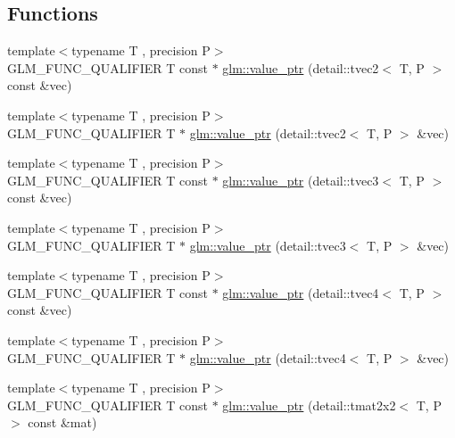 \subsection*{Functions}
\begin{DoxyCompactItemize}
\item 
{\footnotesize template$<$typename T , precision P$>$ }\\G\+L\+M\+\_\+\+F\+U\+N\+C\+\_\+\+Q\+U\+A\+L\+I\+F\+I\+ER T const $\ast$ \hyperlink{group__gtc__type__ptr_gac57a976f59e794e6406ecf2924a18f4e}{glm\+::value\+\_\+ptr} (detail\+::tvec2$<$ T, P $>$ const \&vec)
\item 
{\footnotesize template$<$typename T , precision P$>$ }\\G\+L\+M\+\_\+\+F\+U\+N\+C\+\_\+\+Q\+U\+A\+L\+I\+F\+I\+ER T $\ast$ \hyperlink{group__gtc__type__ptr_gac2a64387090621acf7176b63f31b70a2}{glm\+::value\+\_\+ptr} (detail\+::tvec2$<$ T, P $>$ \&vec)
\item 
{\footnotesize template$<$typename T , precision P$>$ }\\G\+L\+M\+\_\+\+F\+U\+N\+C\+\_\+\+Q\+U\+A\+L\+I\+F\+I\+ER T const $\ast$ \hyperlink{group__gtc__type__ptr_ga676a0ba6f4b7cd817fe6d16cb3113857}{glm\+::value\+\_\+ptr} (detail\+::tvec3$<$ T, P $>$ const \&vec)
\item 
{\footnotesize template$<$typename T , precision P$>$ }\\G\+L\+M\+\_\+\+F\+U\+N\+C\+\_\+\+Q\+U\+A\+L\+I\+F\+I\+ER T $\ast$ \hyperlink{group__gtc__type__ptr_ga4babc9956e32bbd0769bc20ab2d73800}{glm\+::value\+\_\+ptr} (detail\+::tvec3$<$ T, P $>$ \&vec)
\item 
{\footnotesize template$<$typename T , precision P$>$ }\\G\+L\+M\+\_\+\+F\+U\+N\+C\+\_\+\+Q\+U\+A\+L\+I\+F\+I\+ER T const $\ast$ \hyperlink{group__gtc__type__ptr_ga6963deec2c77b8a49b3f7e434914f6ba}{glm\+::value\+\_\+ptr} (detail\+::tvec4$<$ T, P $>$ const \&vec)
\item 
{\footnotesize template$<$typename T , precision P$>$ }\\G\+L\+M\+\_\+\+F\+U\+N\+C\+\_\+\+Q\+U\+A\+L\+I\+F\+I\+ER T $\ast$ \hyperlink{group__gtc__type__ptr_gaa3ed69a05293987972b589311e5feb23}{glm\+::value\+\_\+ptr} (detail\+::tvec4$<$ T, P $>$ \&vec)
\item 
{\footnotesize template$<$typename T , precision P$>$ }\\G\+L\+M\+\_\+\+F\+U\+N\+C\+\_\+\+Q\+U\+A\+L\+I\+F\+I\+ER T const $\ast$ \hyperlink{group__gtc__type__ptr_ga013fcf415d78cc3aa9273c5d4f780325}{glm\+::value\+\_\+ptr} (detail\+::tmat2x2$<$ T, P $>$ const \&mat)

\end{DoxyCompactItemize}
